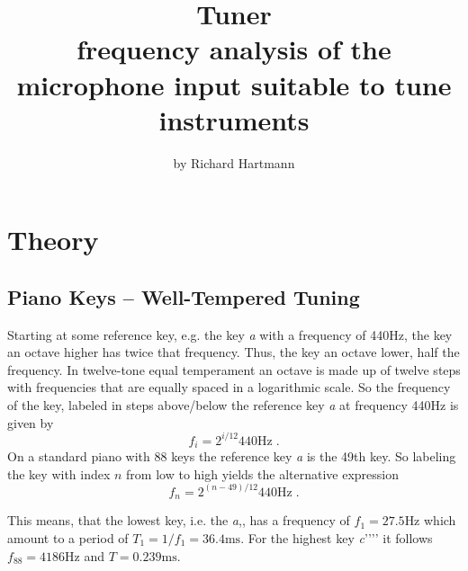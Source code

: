 \documentclass[10pt]{scrartcl}
\title{
Tuner \\
{\small frequency analysis of the microphone input suitable to tune instruments}
}
\author{by Richard Hartmann}
\newcommand{\kll}[1]{\textit{#1}{,}{,}}
\renewcommand{\k}[1]{\textit{#1}}
\newcommand{\khhhh}[1]{\textit{#1}{'}{'}{'}{'}}
\begin{document}
\maketitle
\newpage

\tableofcontents
\newpage

\section{Theory}

\subsection{Piano Keys -- Well-Tempered Tuning}

Starting at some reference key, e.g. the key \k{a} with a frequency of 440Hz, the key an octave higher has twice that frequency. 
Thus, the key an octave lower, half the frequency.
In twelve-tone equal temperament an octave is made up of twelve steps with frequencies that are equally spaced in a logarithmic scale.
So the frequency of the key, labeled in steps above/below the reference key \k{a} at frequency  440Hz is given by
\begin{equation}
    f_i = 2^{i/12} 440 \mathrm{Hz} \; .
\end{equation}
On a standard piano with 88 keys the reference key \k{a} is the 49th key.
So labeling the key with index $n$ from low to high yields the alternative expression
\begin{equation}
    f_n = 2^{(n-49)/12} 440 \mathrm{Hz} \; .
\end{equation}

This means, that the lowest key, i.e. the \kll{a} has a frequency of $f_1 = 27.5$Hz which amount to a period of $T_1 = 1/f_1 = 36.4\mathrm{ms}$. 
For the highest key \khhhh{c} it follows $f_{88} = 4186$Hz and $T = 0.239\mathrm{ms}$.
\end{document}
